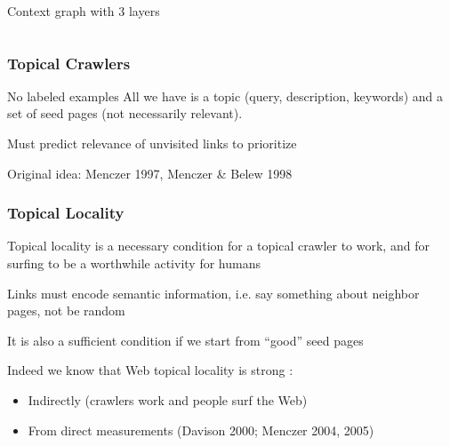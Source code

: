 \documentclass{beamer}
\begin{document}
\begin{frame}
\begin{columns}
\begin{column}{0.4\textwidth}
\begin{center}
Context graph with 3 layers

\end{center}

\end{column}

\end{columns}

\end{frame}



\begin{frame} \frametitle{Topical Crawlers}

\begin{block}{No labeled examples}
All we have is a topic (query, description, keywords) and a set of
seed pages (not necessarily relevant). 
\end{block}

Must predict relevance of unvisited links to prioritize

\small{Original idea: Menczer 1997, Menczer \& Belew 1998 }

\end{frame}







\begin{frame} \frametitle{Topical Locality}

Topical locality is a necessary condition for a topical crawler to
work, and for surfing to be a worthwhile activity for humans

Links must encode semantic information, i.e. say something about neighbor pages, not be random

It is also a sufficient condition if we start from ``good'' seed pages

Indeed we know that Web topical locality is strong :
\begin{itemize}
\item Indirectly (crawlers work and people surf the Web)
\item From direct measurements (Davison 2000; Menczer 2004, 2005)
\end{itemize}


\end{frame}
\end{document}

